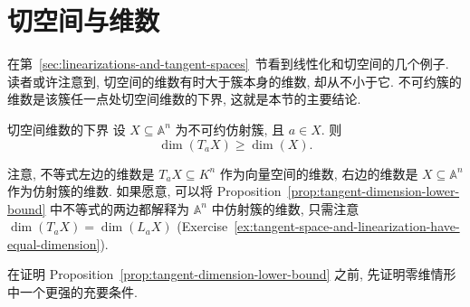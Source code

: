 \section{切空间与维数}\label{sec:dimension-of-tangent-spaces}

在第~\ref{sec:linearizations-and-tangent-spaces}~节看到线性化和切空间的几个例子. 读者或许注意到, 切空间的维数有时大于簇本身的维数, 却从不小于它. 不可约簇的维数是该簇任一点处切空间维数的下界, 这就是本节的主要结论.

\begin{Proposition}{切空间维数的下界}\leavevmode\label{prop:tangent-dimension-lower-bound}
设 $X\subseteq\mathbb{A}^{n}$ 为不可约仿射簇, 且 $a\in X$. 则
\[
  \dim(T_{a}X)\geq\dim(X).
\]
\end{Proposition}

注意, 不等式左边的维数是 $T_{a}X\subseteq K^{n}$ 作为向量空间的维数, 右边的维数是 $X\subseteq\mathbb{A}^{n}$ 作为仿射簇的维数. 如果愿意, 可以将 Proposition~\ref{prop:tangent-dimension-lower-bound} 中不等式的两边都解释为 $\mathbb{A}^{n}$ 中仿射簇的维数, 只需注意 $\dim(T_{a}X)=\dim(L_{a}X)$ (Exercise~\ref{ex:tangent-space-and-linearization-have-equal-dimension}).

在证明 Proposition~\ref{prop:tangent-dimension-lower-bound} 之前, 先证明零维情形中一个更强的充要条件.

